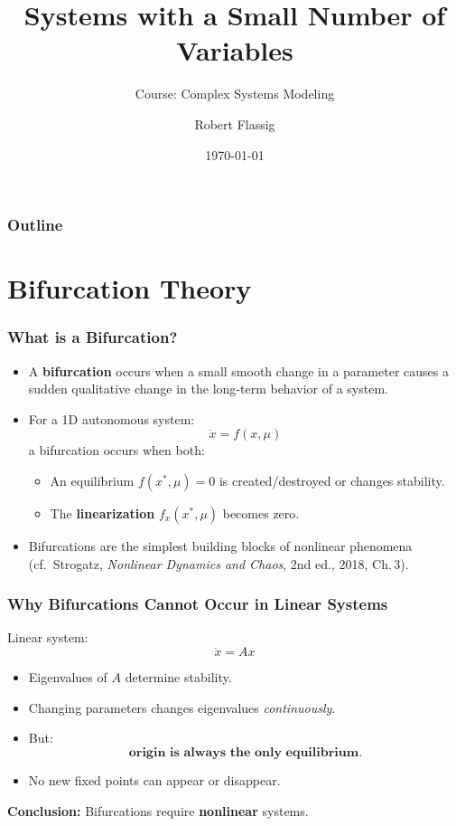 \documentclass{beamer}
\title{Systems with a Small Number of
Variables}
\subtitle{Course: Complex Systems Modeling}
\author{Robert Flassig}
\institute{Brandenburg University of Applied Sciences}
\date{\today}
\begin{document}
\begin{frame}
\titlepage
\end{frame}

\begin{frame}
\frametitle{Outline}
\tableofcontents
\end{frame}
\section{Bifurcation Theory}

\begin{frame}
\frametitle{What is a Bifurcation?}

\begin{itemize}
    \item A \textbf{bifurcation} occurs when a small smooth change in a parameter
    causes a sudden qualitative change in the long-term behavior of a system.
    \item For a 1D autonomous system:
    \[
    \dot x = f(x,\mu)
    \]
    a bifurcation occurs when both:
    \begin{itemize}
        \item An equilibrium \(f(x^\ast,\mu)=0\) is created/destroyed or changes stability.
        \item The \textbf{linearization} \(f_x(x^\ast,\mu)\) becomes zero.
    \end{itemize}
    \item Bifurcations are the simplest building blocks of nonlinear phenomena
    (cf.\ Strogatz, \emph{Nonlinear Dynamics and Chaos}, 2nd ed., 2018, Ch.\,3).
\end{itemize}

\end{frame}

\begin{frame}
\frametitle{Why Bifurcations Cannot Occur in Linear Systems}

Linear system:
\[
\dot x = A x
\]

\begin{itemize}
    \item Eigenvalues of \(A\) determine stability.
    \item Changing parameters changes eigenvalues \emph{continuously}.
    \item But:
    \[
    \textbf{origin is always the only equilibrium.}
    \]
    \item No new fixed points can appear or disappear.
\end{itemize}

\textbf{Conclusion:}  
Bifurcations require \textbf{nonlinear} systems.

\end{frame}
\end{document}
